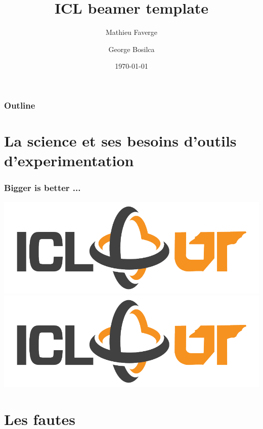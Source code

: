 \documentclass{beamer}
\title[Checking the ICL beamer template]{ICL beamer template}
\author[M.Faverge]{Mathieu Faverge}
\author[G.Bosilca]{George Bosilca}
\date[\today]{\today}
\begin{document}
\maketitle

\begin{frame}
  \frametitle{Outline}
  \tableofcontents
\end{frame}

\section{La science et ses besoins d'outils d'experimentation}

\begin{frame}
\frametitle{Bigger is better ...}
\begin{overprint}
  \centering\includegraphics[scale=0.3]{ICL-slide-logo}
  \centering\includegraphics[scale=0.6]{ICL-slide-logo}
\end{overprint}
\end{frame}


\section{Les fautes}
\end{document}

